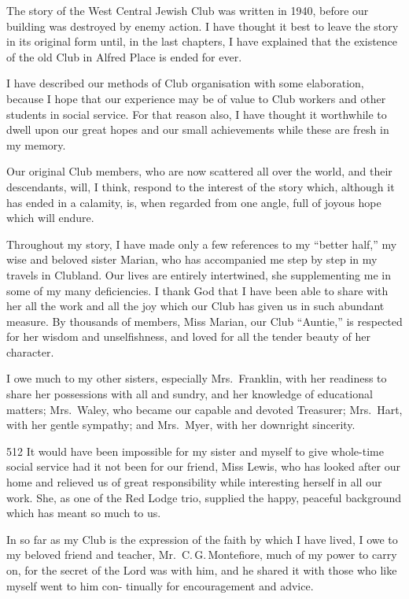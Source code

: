 \cleardoublepage
\tableofcontents*

{
The story of the West Central Jewish Club was written
in 1940, before our building was destroyed by enemy
action. I have thought it best to leave the story in its
original form until, in the last chapters, I have explained
that the existence of the old Club in Alfred Place is
ended for ever.

I have described our methods of Club organisation
with some elaboration, because I hope that our experience
may be of value to Club workers and other students
in social service. For that reason also, I have thought it
worthwhile to dwell upon our great hopes and our small
achievements while these are fresh in my memory.

Our original Club members, who are now scattered
all over the world, and their descendants, will, I think,
respond to the interest of the story which, although it has
ended in a calamity, is, when regarded from one angle,
full of joyous hope which will endure.

Throughout my story, I have made only a few references
to my “better half,” my wise and beloved sister
Marian, who has accompanied me step by step in my
travels in Clubland. Our lives are entirely intertwined,
she supplementing me in some of my many deficiencies.
I thank God that I have been able to share with her all
the work and all the joy which our Club has given us in
such abundant measure. By thousands of members, Miss
Marian, our Club “Auntie,” is respected for her wisdom
and unselfishness, and loved for all the tender beauty of
her character.

I owe much to my other sisters, especially Mrs.\ Franklin,
with her readiness to share her possessions with all
and sundry, and her knowledge of educational matters;
Mrs.\ Waley, who became our capable and devoted
Treasurer; Mrs.\ Hart, with her gentle sympathy; and
Mrs.\ Myer, with her downright sincerity.

\begin{tp}{512}
It would have been impossible for my sister and myself
to give whole-time social service had it not been for our
friend, Miss Lewis, who has looked after our home and
relieved us of great responsibility while interesting herself
in all our work. She, as one of the Red Lodge trio, supplied
the happy, peaceful background which has meant
so much to us.
\end{tp}

In so far as my Club is the expression of the faith by
which I have lived, I owe to my beloved friend and
teacher, Mr.\ C.\,G.\,Montefiore, much of my power to
carry on, for the secret of the Lord was with him, and
he shared it with those who like myself went to him con-
tinually for encouragement and advice.

}
